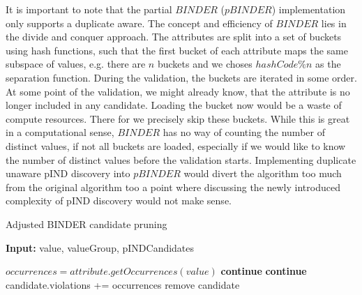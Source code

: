 It is important to note that the partial $BINDER$ ($pBINDER$) implementation only supports a duplicate aware. The concept and efficiency of $BINDER$ lies in the divide and conquer approach. The attributes are split into a set of buckets using hash functions, such that the first bucket of each attribute maps the same subspace of values, e.g. there are $n$ buckets and we choses $hashCode \% n$ as the separation function. During the validation, the buckets are iterated in some order. At some point of the validation, we might already know, that the attribute is no longer included in any candidate. Loading the bucket now would be a waste of compute resources. There for we precisely skip these buckets. While this is great in a computational sense, $BINDER$ has no way of counting the number of distinct values, if not all buckets are loaded, especially if we would like to know the number of distinct values before the validation starts. Implementing duplicate unaware pIND discovery into $pBINDER$ would divert the algorithm too much from the original algorithm too a point where discussing the newly introduced complexity of pIND discovery would not make sense.



\begin{algorithm}
    \caption{Adjusted BINDER candidate pruning}\label{alg:BINDER_prune}
    \hspace*{\algorithmicindent} \textbf{Input:} value, valueGroup, pINDCandidates
    \begin{algorithmic}[1]
        \State $occurrences = attribute.getOccurrences(value)$
                \State \textbf{continue}
            \EndIf
                \State \textbf{continue}
            \EndIf
            \State candidate.violations += occurrences
                \State remove candidate
            \EndIf
        \EndFor
    \EndFor
    \end{algorithmic}
\end{algorithm}




